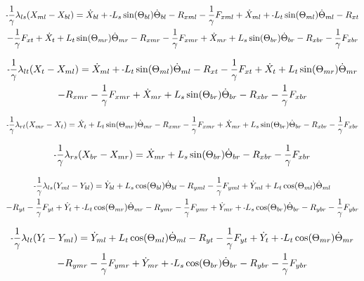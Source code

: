 \documentclass[11pt, landscape]{article}
\newcommand{\mn}{\scalebox{0.7}[1.0]{-}}
\begin{document}
\begin{multline}
\mn\frac{1}{\gamma}\lambda_{ls}(X_{ml} - X_{bl}) =
\dot{X}_{bl} + \mn L_{s}\sin(\Theta_{bl})\dot{\Theta}_{bl} - R_{xml} - \frac{1}{\gamma}F_{xml} + \dot{X}_{ml} + \mn L_{t}\sin(\Theta_{ml})\dot{\Theta}_{ml} - R_{xt } \\
- \frac{1}{\gamma}F_{xt } + \dot{X}_{t } + L_{t}\sin(\Theta_{mr})\dot{\Theta}_{mr} - R_{xmr}
-\frac{1}{\gamma}F_{xmr} + \dot{X}_{mr} + L_{s}\sin(\Theta_{br})\dot{\Theta}_{br} - R_{xbr} - \frac{1}{\gamma}F_{xbr}
\end{multline}%

\begin{multline}
\mn\frac{1}{\gamma}\lambda_{lt}(X_{t } - X_{ml}) =
\dot{X}_{ml} + \mn L_{t}\sin(\Theta_{ml})\dot{\Theta}_{ml} - R_{xt } - \frac{1}{\gamma}F_{xt } + \dot{X}_{t } + L_{t}\sin(\Theta_{mr})\dot{\Theta}_{mr} \\
- R_{xmr} - \frac{1}{\gamma}F_{xmr} + \dot{X}_{mr} + L_{s}\sin(\Theta_{br})\dot{\Theta}_{br} - R_{xbr} - \frac{1}{\gamma}F_{xbr}
\end{multline}%

\begin{equation}
\mn\frac{1}{\gamma}\lambda_{rt}(X_{mr} - X_{t }) =
\dot{X}_{t } + L_{t}\sin(\Theta_{mr})\dot{\Theta}_{mr} - R_{xmr} - \frac{1}{\gamma}F_{xmr}
+ \dot{X}_{mr} + L_{s}\sin(\Theta_{br})\dot{\Theta}_{br} - R_{xbr} - \frac{1}{\gamma}F_{xbr}
\end{equation}%

\begin{equation}
\mn\frac{1}{\gamma}\lambda_{rs}(X_{br} - X_{mr}) = 
\dot{X}_{mr} + L_{s}\sin(\Theta_{br})\dot{\Theta}_{br} - R_{xbr} - \frac{1}{\gamma}F_{xbr}
\end{equation}%


\begin{multline}
\mn\frac{1}{\gamma}\lambda_{ls}(Y_{ml} - Y_{bl}) =
\dot{Y}_{bl} + L_{s}\cos(\Theta_{bl})\dot{\Theta}_{bl} - R_{yml} - \frac{1}{\gamma}F_{yml} + \dot{Y}_{ml} + L_{t}\cos(\Theta_{ml})\dot{\Theta}_{ml} \\
- R_{yt} - \frac{1}{\gamma}F_{yt } + \dot{Y}_{t } + \mn L_{t}\cos(\Theta_{mr})\dot{\Theta}_{mr} - R_{ymr} - \frac{1}{\gamma}F_{ymr} + \dot{Y}_{mr}
+ \mn L_{s}\cos(\Theta_{br})\dot{\Theta}_{br} - R_{ybr} - \frac{1}{\gamma}F_{ybr}
\end{multline}%


\begin{multline}
\mn\frac{1}{\gamma}\lambda_{lt}(Y_{t } - Y_{ml}) =
\dot{Y}_{ml} + L_{t}\cos(\Theta_{ml})\dot{\Theta}_{ml} - R_{yt} - \frac{1}{\gamma}F_{yt } + \dot{Y}_{t } + \mn L_{t}\cos(\Theta_{mr})\dot{\Theta}_{mr} \\
- R_{ymr} - \frac{1}{\gamma}F_{ymr} + \dot{Y}_{mr} + \mn L_{s}\cos(\Theta_{br})\dot{\Theta}_{br} - R_{ybr} - \frac{1}{\gamma}F_{ybr}
\end{multline}%
\end{document}
